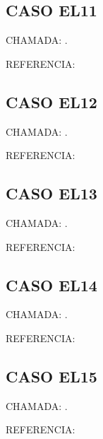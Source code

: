\documentclass{undftex}
\begin{document}
\begin{refsection}\section*{CASO EL11}\noindent CHAMADA: . \textcite{loc11}\par\noindent REFERENCIA:\par\printbibliography[heading=none,check=undfconsultadas]\end{refsection}\clearpage
\begin{refsection}\section*{CASO EL12}\noindent CHAMADA: . \textcite{loc12}\par\noindent REFERENCIA:\par\printbibliography[heading=none,check=undfconsultadas]\end{refsection}\clearpage
\begin{refsection}\section*{CASO EL13}\noindent CHAMADA: . \textcite{loc13}\par\noindent REFERENCIA:\par\printbibliography[heading=none,check=undfconsultadas]\end{refsection}\clearpage
\begin{refsection}\section*{CASO EL14}\noindent CHAMADA: . \textcite{loc14}\par\noindent REFERENCIA:\par\printbibliography[heading=none,check=undfconsultadas]\end{refsection}\clearpage
\begin{refsection}\section*{CASO EL15}\noindent CHAMADA: . \textcite{loc15}\par\noindent REFERENCIA:\par\printbibliography[heading=none,check=undfconsultadas]\end{refsection}\clearpage
\end{document}
